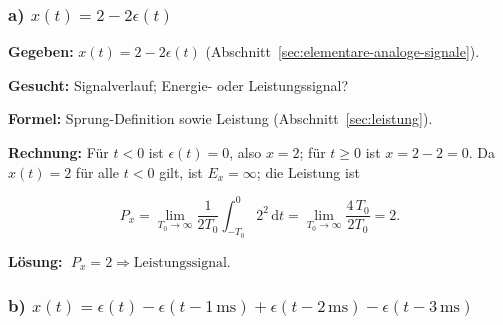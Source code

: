 \subsubsection*{a) $x(t) = 2 - 2\epsilon(t)$}

\begin{beispiel}

\textbf{Gegeben:} $x(t) = 2 - 2\epsilon(t)$
(Abschnitt~\ref{sec:elementare-analoge-signale}).

\textbf{Gesucht:} Signalverlauf; Energie- oder Leistungssignal?

\textbf{Formel:} Sprung-Definition sowie Leistung
(Abschnitt~\ref{sec:leistung}).

\textbf{Rechnung:} Für $t < 0$ ist $\epsilon(t) = 0$, also $x = 2$; für
$t \geq 0$ ist $x = 2 - 2 = 0$. Da $x(t) = 2$ für alle $t < 0$ gilt, ist
$E_x = \infty$; die Leistung ist

$$
P_x = \lim_{T_0 \to \infty} \frac{1}{2T_0}\int_{-T_0}^{0} 2^2\,\mathrm{d}t
    = \lim_{T_0 \to \infty} \frac{4\,T_0}{2T_0} = 2.
$$

\begin{center}
\end{center}

\textbf{Lösung:} $\boxed{\;P_x = 2 \Rightarrow \text{Leistungssignal.}\;}$

\end{beispiel}

\subsubsection*{b) $x(t) = \epsilon(t) - \epsilon(t-1\,\mathrm{ms}) + \epsilon(t-2\,\mathrm{ms}) - \epsilon(t-3\,\mathrm{ms})$}

